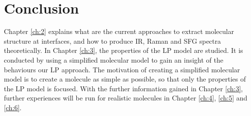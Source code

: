 \section{Conclusion}
Chapter \ref{ch:2} explains what are the current approaches to extract molecular structure at interfaces, and how to produce IR, Raman and SFG spectra theoretically. In Chapter \ref{ch:3}, the properties of the LP model are studied. It is conducted by using a simplified molecular model to gain an insight of the behaviours our LP approach. The motivation of creating a simplified molecular model is to create a molecule as simple as possible, so that only the properties of the LP model is focused. With the further information gained in Chapter \ref{ch:3}, further experiences will be run for realistic molecules in Chapter \ref{ch:4}, \ref{ch:5} and \ref{ch:6}.